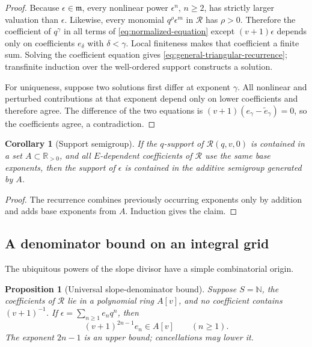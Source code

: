 \documentclass[11pt,oneside]{article}
\theoremstyle{plain}
\newtheorem{proposition}[theorem]{Proposition}
\newtheorem{corollary}[theorem]{Corollary}
\theoremstyle{definition}
\theoremstyle{remark}
\newcommand{\R}{\mathbb{R}}
\newcommand{\N}{\mathbb{N}}
\newcommand{\Rcal}{\mathcal{R}}
\newcommand{\mideal}{\mathfrak{m}}
\begin{document}
\begin{proof}
Because \(\epsilon\in\mideal\), every nonlinear power \(\epsilon^n\),
\(n\ge2\), has strictly larger valuation than \(\epsilon\).  Likewise, every
monomial \(q^\rho\epsilon^m\) in \(\Rcal\) has \(\rho>0\).  Therefore the
coefficient of \(q^\gamma\) in all terms of
\cref{eq:normalized-equation} except \((v+1)\epsilon\) depends only on
coefficients \(e_\delta\) with \(\delta<\gamma\).  Local finiteness makes that
coefficient a finite sum.  Solving the coefficient equation gives
\cref{eq:general-triangular-recurrence}; transfinite induction over the
well-ordered support constructs a solution.

For uniqueness, suppose two solutions first differ at exponent \(\gamma\).
All nonlinear and perturbed contributions at that exponent depend only on
lower coefficients and therefore agree.  The difference of the two equations
is \((v+1)(e_\gamma-\widetilde e_\gamma)=0\), so the coefficients agree, a
contradiction.
\end{proof}

\begin{corollary}[Support semigroup]
\label{cor:support}
If the \(q\)-support of \(\Rcal(q,v,0)\) is contained in a set \(A\subset
\R_{>0}\), and all \(E\)-dependent coefficients of \(\Rcal\) use the same
base exponents, then the support of \(\epsilon\) is contained in the additive
semigroup generated by \(A\).
\end{corollary}

\begin{proof}
The recurrence combines previously occurring exponents only by addition and
adds base exponents from \(A\).  Induction gives the claim.
\end{proof}

\subsection{A denominator bound on an integral grid}

The ubiquitous powers of the slope divisor have a simple combinatorial
origin.

\begin{proposition}[Universal slope-denominator bound]
\label{prop:denominator-bound}
Suppose \(S=\N\), the coefficients of \(\Rcal\) lie in a polynomial ring
\(A[v]\), and no coefficient contains \((v+1)^{-1}\).  If
\(\epsilon=\sum_{n\ge1}e_nq^n\), then
\begin{equation}
 (v+1)^{2n-1}e_n\in A[v]
 \qquad(n\ge1).
 \label{eq:denominator-bound}
\end{equation}
The exponent \(2n-1\) is an upper bound; cancellations may lower it.
\end{proposition}
\end{document}
